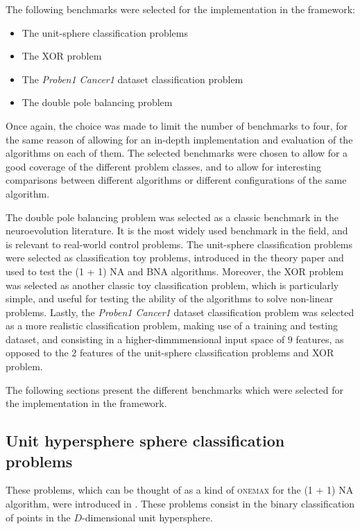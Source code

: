 The following benchmarks were selected for the implementation in the framework:

\begin{itemize}
    \item The unit-sphere classification problems
    \item The XOR problem
    \item The \textit{Proben1 Cancer1} dataset classification problem
    \item The double pole balancing problem
\end{itemize}

Once again, the choice was made to limit the number of benchmarks to four, for the same reason of allowing for an in-depth implementation and evaluation of the algorithms on each of them.
The selected benchmarks were chosen to allow for a good coverage of the different problem classes, and to allow for interesting comparisons between different algorithms or different
configurations of the same algorithm.

The double pole balancing problem was selected as a classic benchmark in the neuroevolution literature. It is the most widely used benchmark in the field, and is relevant to real-world
control problems. The unit-sphere classification problems were selected as classification toy problems, introduced in the theory paper \cite{na} and used to test the (1 + 1) NA and BNA algorithms.
Moreover, the XOR problem was selected as another classic toy classification problem, which is particularly simple, and useful for testing the ability of the algorithms to solve non-linear problems.
Lastly, the \textit{Proben1 Cancer1} dataset classification problem was selected as a more realistic classification problem, making use of a training and testing dataset, and consisting
in a higher-dimmmensional input space of $9$ features, as opposed to the $2$ features of the unit-sphere classification problems and XOR problem.

The following sections present the different benchmarks which were selected for the implementation in the framework.

\subsection{Unit hypersphere sphere classification problems}
\label{subsection:sphere_classification}


These problems, which can be thought of as a kind of \textsc{onemax} for the (1 + 1) NA algorithm, were introduced in \cite{na}.
These problems consist in the binary classification of points in the $D$-dimensional unit hypersphere.

